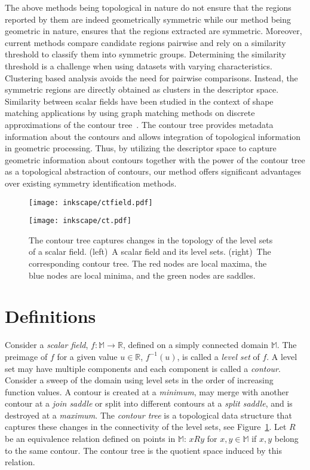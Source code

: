 \documentclass[review,journal]{vgtc}         %
\begin{document}
The above methods being topological in nature do not ensure that the regions reported by
them are indeed geometrically symmetric while our method being geometric in nature, 
ensures that the regions extracted are symmetric. Moreover, current methods compare candidate regions 
pairwise and rely on a similarity threshold to classify them into symmetric groups. Determining
the similarity threshold is a challenge when using datasets with varying characteristics.
Clustering based analysis avoids the need for pairwise comparisons. Instead, the symmetric regions
are directly obtained as clusters in the descriptor space. 
Similarity between scalar fields have been
studied in the context of shape matching applications by using graph matching methods on 
discrete approximations of the contour tree~\cite{ZhangBKDNB06,HilagaSKK01}.
The contour tree provides metadata information about the contours
and allows integration of topological information in geometric processing. Thus, by utilizing 
the descriptor space to capture geometric information about contours together with the power of 
the contour tree as a topological abstraction of contours, our method offers significant advantages over 
existing symmetry identification methods. 
\begin{figure}[b]
	\centering
	{
		\centering
		\begin{minipage}[c][2.4cm][b]{0.4\linewidth}
			{
				\texttt{[image: inkscape/ctfield.pdf]}
			}
		\end{minipage}
	}
	{
		\centering
		\hspace{1cm}
		\begin{minipage}[c][2.45cm][b]{0.3\linewidth}
			{
				\texttt{[image: inkscape/ct.pdf]}
			}	
		\end{minipage}
	}
	\caption{\label{ct}The contour tree captures changes in the topology of the level sets of a scalar field. 
	(left)~A scalar field and its level sets. (right)~The corresponding contour tree. The red nodes are
	local maxima, the blue nodes are local minima, and the green nodes are saddles.}
\end{figure}
\section{Definitions}
Consider a \emph{scalar field}, $f : \mathbb{M}  \rightarrow \mathbb{R}$, defined on a 
simply connected domain $\mathbb{M}$. The preimage of $f$ for a given value $u \in \mathbb{R}$, 
$f^{-1}(u)$, is called a \emph{level set} of $f$. A level set may have multiple components
and each component is called a \emph{contour}. Consider a sweep of the domain using level sets in the order
of increasing function values. A contour is created at a \emph{minimum}, may merge
with another contour at a \emph{join saddle} or split into different contours at a \emph{split saddle}, 
and is destroyed at a \emph{maximum}. The \emph{contour tree} is a topological 
data structure that captures these changes in the connectivity of the level sets, see Figure~\ref{ct}.
Let $R$ be an equivalence relation defined on points in $\mathbb{M}$: $xRy$ for $x,y 
\in \mathbb{M}$  if $x,y$ belong to the same contour. The contour tree is the quotient space 
induced by this relation. 
\end{document}
